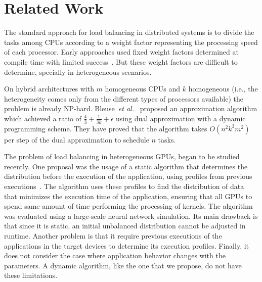 \documentclass[journal]{IEEEtran}
\begin{document}

\section{Related Work}\label{sec:ralated}

The standard approach for load balancing in distributed systems is to divide the
tasks among CPUs according to a weight factor representing the processing speed
of each processor. Early approaches used fixed weight factors determined at
compile time with limited success~\cite{Hummel}. But these weight factors are
difficult to determine, specially in heterogeneous scenarios.

On hybrid architectures with $m$ homogeneous CPUs and $k$ homogeneous
(i.e., the heterogeneity comes only from the different types of
processors available) the problem is already
NP-hard. Bleuse~\textit{et al.}~\cite{bleuse2014scheduling} proposed
an approximation algorithm which achieved a ratio of $\frac{4}{3} +
\frac{1}{3k} + \epsilon$ using dual approximation with a dynamic
programming scheme. They have proved that the algorithm takes
$O(n^2k^3m^2)$ per step of the dual approximation to schedule $n$
tasks.

The problem of load balancing in heterogeneous GPUs, began to be studied
recently. One proposal was the usage of a static algorithm that determines the
distribution before the execution of the application, using profiles from
previous executions~\cite{raphael}. The algorithm uses these profiles to find
the distribution of data that minimizes the execution time of the application,
ensuring that all GPUs to spend same amount of time performing the processing of
kernels. The algorithm was evaluated using a large-scale neural network
simulation. Its main drawback is that since it is static, an initial unbalanced
distribution cannot be adjusted in runtime. Another problem is that it require
previous executions of the applications in the target devices to determine its
execution profiles. Finally, it does not consider the case where application
behavior changes with the parameters. A dynamic algorithm, like the one that we
propose, do not have these limitations.
\end{document}
